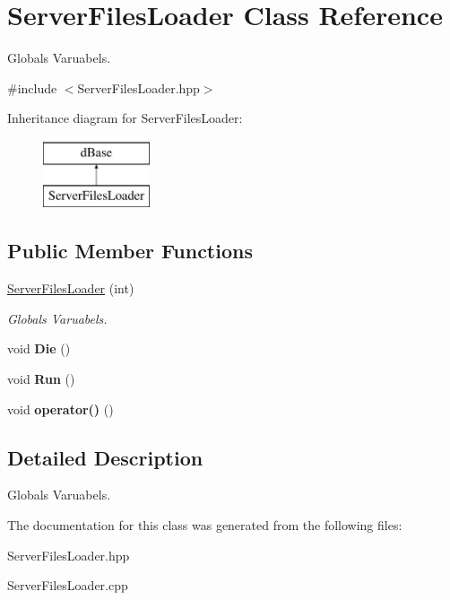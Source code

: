 \hypertarget{classServerFilesLoader}{
\section{ServerFilesLoader Class Reference}
\label{classServerFilesLoader}
}


Globals Varuabels.  




{\ttfamily \#include $<$ServerFilesLoader.hpp$>$}

Inheritance diagram for ServerFilesLoader:\begin{figure}[H]
\begin{center}
\leavevmode
\includegraphics[height=2cm]{classServerFilesLoader}
\end{center}
\end{figure}
\subsection*{Public Member Functions}
\begin{DoxyCompactItemize}
\item 
\hypertarget{classServerFilesLoader_a663068c34adbc6f88781b2caac5cb14e}{
\hyperlink{classServerFilesLoader_a663068c34adbc6f88781b2caac5cb14e}{ServerFilesLoader} (int)}
\label{classServerFilesLoader_a663068c34adbc6f88781b2caac5cb14e}

\begin{DoxyCompactList}\small\item\em Globals Varuabels. \item\end{DoxyCompactList}\item 
\hypertarget{classServerFilesLoader_a834ccacf7f96f1959c01d887faa8a453}{
void {\bfseries Die} ()}
\label{classServerFilesLoader_a834ccacf7f96f1959c01d887faa8a453}

\item 
\hypertarget{classServerFilesLoader_a09be86f7b09f6b91e21f96b04e19ba47}{
void {\bfseries Run} ()}
\label{classServerFilesLoader_a09be86f7b09f6b91e21f96b04e19ba47}

\item 
\hypertarget{classServerFilesLoader_af7e11ee3f9d4809de4c215e2f3a007ec}{
void {\bfseries operator()} ()}
\label{classServerFilesLoader_af7e11ee3f9d4809de4c215e2f3a007ec}

\end{DoxyCompactItemize}


\subsection{Detailed Description}
Globals Varuabels. 

The documentation for this class was generated from the following files:\begin{DoxyCompactItemize}
\item 
ServerFilesLoader.hpp\item 
ServerFilesLoader.cpp\end{DoxyCompactItemize}
